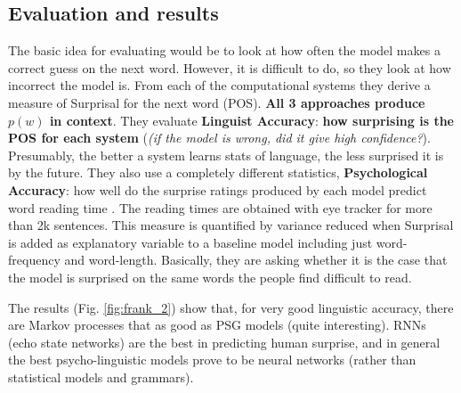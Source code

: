 \subsection{Evaluation and results}
The basic idea for evaluating would be to look at how often the model makes a correct guess on the next word. However, it is difficult to do, so they look at how incorrect the model is. 
From each of the computational systems they derive a measure of Surprisal for the next word (POS). \textbf{All 3 approaches produce $p(w)$ in context}. 
They evaluate \textbf{Linguist Accuracy}: \textbf{how surprising is the POS for each system} (\textit{(if the model is wrong, did it give high confidence?}). Presumably, the better a system learns stats of language, the less surprised it is by the future.
They also use a completely different statistics, \textbf{Psychological Accuracy}: how well do the surprise ratings produced by each model predict word reading time \notet.
The reading times are obtained with eye tracker for more than 2k sentences. This measure is quantified by variance reduced when Surprisal is added as explanatory variable to a baseline model including just word-frequency and word-length. Basically, they are asking whether it is the case that the model is surprised on the same words the people find difficult to read.


The results (Fig. \ref{fig:frank_2}) show that, for very good linguistic accuracy, there are Markov processes that as good as PSG models (quite interesting).
RNNs (echo state networks) are the best in predicting human surprise, and in general the best psycho-linguistic models prove to be neural networks (rather than statistical models and grammars).

